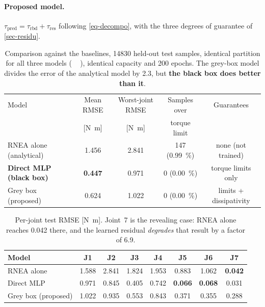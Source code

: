 \documentclass[a4paper, oneside]{article}
\newcommand{\code}[1]{%
    \mbox{\ttfamily\small%
        \detokenize{#1}%
    }%
}
\newcommand{\taurbd}{\ensuremath{\tau_{\mathrm{rbd}}}}
\newcommand{\taures}{\ensuremath{\tau_{\mathrm{res}}}}
\newcommand{\taupred}{\ensuremath{\tau_{\mathrm{pred}}}}
\begin{document}
\paragraph{Proposed model.}
$\taupred = \taurbd + \taures$ following \cref{eq-decompo}, with the three
degrees of guarantee of \cref{sec-residu}.


\begin{table}[htbp]
\centering
\caption{Comparison against the baselines, \SI{14830}{} held-out test samples,
identical partition for all three models (\code{seed=12345}), identical
capacity and \num{200} epochs. The grey-box model divides the error of the
analytical model by \num{2.3}, but \textbf{the black box does better than it}.}
\label{tab-baselines}
\small
\begin{tabular}{@{}lcccc@{}}
\toprule
Model & Mean RMSE & Worst-joint RMSE & Samples over & Guarantees \\
 & [\si{\newton\meter}] & [\si{\newton\meter}] & torque limit & \\
\midrule
RNEA alone (analytical) & \num{1.456} & \num{2.841} & 147 (\SI{0.99}{\percent})
& none (not trained) \\
\textbf{Direct MLP (black box)} & \textbf{\num{0.447}} & \num{0.971}
& 0 (\SI{0.00}{\percent}) & torque limits only \\
Grey box (proposed) & \num{0.624} & \num{1.022} & 0 (\SI{0.00}{\percent})
& limits + dissipativity \\
\bottomrule
\end{tabular}
\end{table}

\begin{table}[htbp]
\centering
\caption{Per-joint test RMSE [\si{\newton\meter}]. Joint~7 is the revealing
case: RNEA alone reaches \num{0.042} there, and the learned residual
\emph{degrades} that result by a factor of \num{6.9}.}
\label{tab-perjoint-baselines}
\small
\begin{tabular}{@{}lccccccc@{}}
\toprule
Model & J1 & J2 & J3 & J4 & J5 & J6 & J7 \\
\midrule
RNEA alone & \num{1.588} & \num{2.841} & \num{1.824} & \num{1.953}
& \num{0.883} & \num{1.062} & \textbf{\num{0.042}} \\
Direct MLP & \num{0.971} & \num{0.845} & \num{0.405} & \num{0.742}
& \textbf{\num{0.066}} & \textbf{\num{0.068}} & \num{0.031} \\
Grey box (proposed) & \num{1.022} & \num{0.935} & \num{0.553} & \num{0.843}
& \num{0.371} & \num{0.355} & \num{0.288} \\
\bottomrule
\end{tabular}
\end{table}
\end{document}
